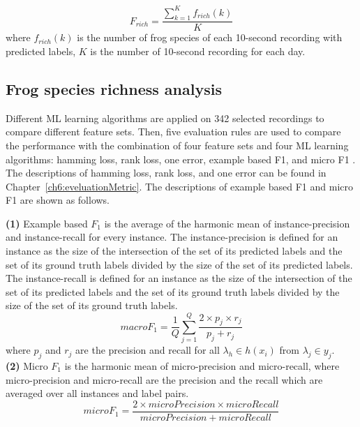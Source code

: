 \begin{equation}
F_{rich} = \frac{\sum_{k=1}^{K}f_{rich}(k)}{K}
\end{equation} 
where $f_{rich}(k)$ is the number of frog species of each 10-second recording with predicted labels, $K$ is the number of 10-second recording for each day.





\subsection{Frog species richness analysis}
Different ML learning algorithms are applied on 342 selected recordings to compare different feature sets. Then, five evaluation rules are used to compare the performance with the combination of four feature sets and four ML learning algorithms: hamming loss, rank loss, one error, example based F1, and micro F1 \citep{Madjarov20123084, ZhangReview2014}. The descriptions of hamming loss, rank loss, and one error can be found in Chapter~\ref{ch6:eveluationMetric}. The descriptions of example based F1  and micro F1 are shown as follows.



\textbf{(1)}
Example based $F_{1}$ is the average of the harmonic mean of instance-precision and instance-recall for every instance. The instance-precision is defined for an instance as the size of the intersection of the set of its predicted labels and the set of its ground truth labels divided by the size of the set of its predicted labels. The instance-recall is defined for an instance as the size of the intersection of the set of its predicted labels and the set of its ground truth labels divided by the size of the set of its ground truth labels.
\begin{equation}
macroF_{1}=\frac{1}{Q}\sum_{j=1}^{Q}\frac{2 \times p_{j} \times r_{j}}{p_{j}+r_{j}}
\end{equation}
where $p_{j}$ and $r_{j}$ are the precision and recall for all $\lambda_{h} \in h(x_{i})$ from $\lambda_{j} \in y_{j}$.
\\
\textbf{(2)}
Micro $F_{1}$ is the harmonic mean of micro-precision and micro-recall, where micro-precision and micro-recall are the precision and the recall which are averaged over all instances and label pairs. 
\begin{equation}
microF_{1} = \frac{2 \times microPrecision \times microRecall}{microPrecision + microRecall}
\end{equation}



